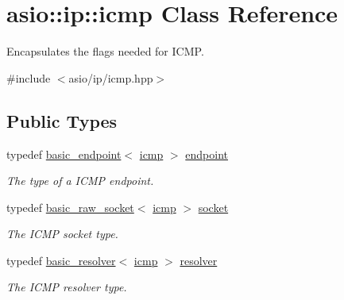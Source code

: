 \hypertarget{classasio_1_1ip_1_1icmp}{}\section{asio\+:\+:ip\+:\+:icmp Class Reference}
\label{classasio_1_1ip_1_1icmp}


Encapsulates the flags needed for I\+C\+M\+P.  




{\ttfamily \#include $<$asio/ip/icmp.\+hpp$>$}

\subsection*{Public Types}
\begin{DoxyCompactItemize}
\item 
typedef \hyperlink{classasio_1_1ip_1_1basic__endpoint}{basic\+\_\+endpoint}$<$ \hyperlink{classasio_1_1ip_1_1icmp}{icmp} $>$ \hyperlink{classasio_1_1ip_1_1icmp_a3b92dc29eb90413d1dc80966c2d4b6ae}{endpoint}
\begin{DoxyCompactList}\small\item\em The type of a I\+C\+M\+P endpoint. \end{DoxyCompactList}\item 
typedef \hyperlink{classasio_1_1basic__raw__socket}{basic\+\_\+raw\+\_\+socket}$<$ \hyperlink{classasio_1_1ip_1_1icmp}{icmp} $>$ \hyperlink{classasio_1_1ip_1_1icmp_a97be192e262054c0adee620d89b9feab}{socket}
\begin{DoxyCompactList}\small\item\em The I\+C\+M\+P socket type. \end{DoxyCompactList}\item 
typedef \hyperlink{classasio_1_1ip_1_1basic__resolver}{basic\+\_\+resolver}$<$ \hyperlink{classasio_1_1ip_1_1icmp}{icmp} $>$ \hyperlink{classasio_1_1ip_1_1icmp_a326f93699ba9f42654917e676fd967aa}{resolver}
\begin{DoxyCompactList}\small\item\em The I\+C\+M\+P resolver type. \end{DoxyCompactList}\end{DoxyCompactItemize}

